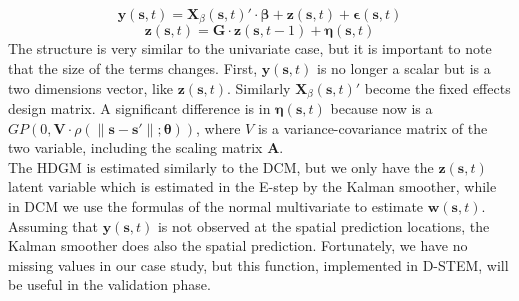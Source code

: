 \begin{displaymath}
	\boldsymbol{y}(\boldsymbol{s}, t) = \boldsymbol{X}_\beta(\boldsymbol{s}, t)' \cdot \boldsymbol{\beta} + \boldsymbol{z}(\boldsymbol{s}, t) + \boldsymbol{\epsilon}(\boldsymbol{s}, t)
\end{displaymath}
\begin{displaymath}
	\boldsymbol{z}(\boldsymbol{s}, t) = \boldsymbol{G} \cdot \boldsymbol{z}(\boldsymbol{s}, t-1) + \boldsymbol{\eta}(\boldsymbol{s}, t)
\end{displaymath}
The structure is very similar to the univariate case, but it is important to note that the size of the terms changes. First, $\boldsymbol{y}(\boldsymbol{s}, t)$ is no longer a scalar but is a two dimensions vector, like $\boldsymbol{z}(\boldsymbol{s}, t)$. Similarly $\boldsymbol{X}_\beta(\boldsymbol{s}, t)'$ become the fixed effects design matrix. A significant difference is in $\boldsymbol{\eta}(\boldsymbol{s},t)$ because now is a $GP(0,\boldsymbol{V} \cdot \rho(\lVert \boldsymbol{s}-\boldsymbol{s}' \rVert; \boldsymbol{\theta}))$, where $V$ is a variance-covariance matrix of the two variable, including the scaling matrix $\boldsymbol{A}$. 
\\ The HDGM is estimated similarly to the DCM, but we only have the $\boldsymbol{z}(\boldsymbol{s},t)$ latent variable which is estimated in the E-step by the Kalman smoother, while in DCM we use the formulas of the normal multivariate to estimate $\boldsymbol{w}(\boldsymbol{s}, t)$. Assuming that $\boldsymbol{y}(\boldsymbol{s}, t)$ is not observed at the spatial prediction locations, the Kalman smoother does also the spatial prediction. Fortunately, we have no missing values in our case study, but this function, implemented in D-STEM, will be useful in the validation phase.